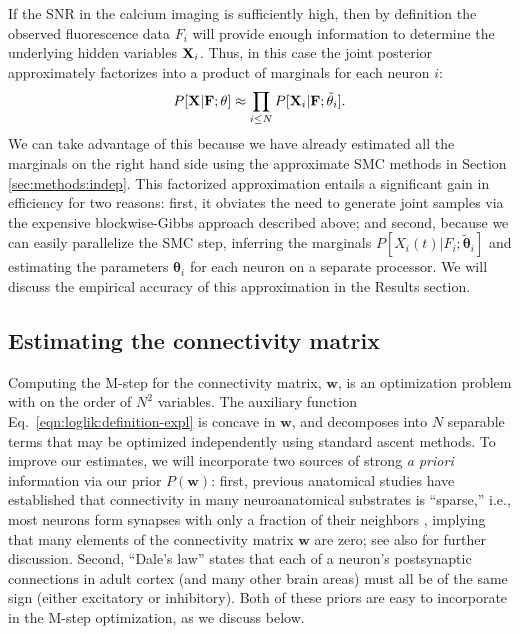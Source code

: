 \documentclass[aoas,preprint]{imsart}
\newcommand{\bth}{\mathbf{\theta}}
\newcommand{\w}{w}
\newcommand{\bw}{\mathbf{\w}}
\newcommand{\bF}{{\bf F}}
\newcommand{\bX}{{\bf X}}
\newcommand{\tbth}{\tilde{\bth}}
\begin{document}
If the SNR in the calcium imaging is sufficiently high, then by
definition the observed fluorescence data $F_i$ will provide enough
information to determine the underlying hidden variables
$\bX_i$. Thus, in this case the joint posterior approximately
factorizes into a product of marginals for each neuron $i$:
\begin{equation} \label{eqn:indep_approx}
  P[\bX|\bF;\bth] \approx \prod_{i\leq N} P[\bX_i | \bF; \tbth_i].
\end{equation}
We can take advantage of this because we have already estimated all
the marginals on the right hand side using the approximate SMC methods
in Section \ref{sec:methods:indep}.  This factorized approximation
entails a significant gain in efficiency for two reasons: first, it
obviates the need to generate joint samples via the expensive
blockwise-Gibbs approach described above; and second, because we can
easily parallelize the SMC step, inferring the marginals $P[X_i(t) |
F_i; \tbth_i]$ and estimating the parameters $\bth_i$ for each neuron
on a separate processor. We will discuss the empirical accuracy of
this approximation in the Results section.

\subsection{Estimating the connectivity matrix} \label{sec:methods:parameters HMM}

Computing the M-step for the connectivity matrix, $\bw$, is an optimization problem with on the order of $N^2$ variables. The auxiliary function Eq.~\eqref{eqn:loglik:definition-expl} is concave in $\bw$, and decomposes into $N$ separable terms that may be optimized independently using standard ascent methods. To improve our estimates, we will incorporate two sources of strong \emph{a priori} information via our prior $P(\bw)$: first, previous anatomical studies have established that connectivity in many neuroanatomical substrates is ``sparse,'' i.e., most neurons form synapses with only a fraction of their neighbors \cite{Buhl94,Thompson88,Reyes98,Feldmeyer99,Gupta00,FeldmeyerSakmann00,PetersenSakmann00,Binzegger04,Song2005,Mishchenko2009b}, implying that many elements of the connectivity matrix $\bw$ are zero; see also \cite{PAN04c,Rigat06,PILL07,Stevenson08} for further discussion. Second, ``Dale's law'' states that each of a neuron's postsynaptic connections in adult cortex (and many other brain areas) must all be of the same sign (either excitatory or inhibitory). Both of these priors are easy to incorporate in the M-step optimization, as we discuss below.
\end{document}
